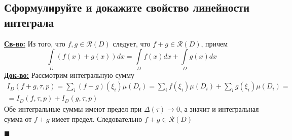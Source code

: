 
\subsection{Сформулируйте и докажите свойство линейности интеграла}

\textbf{\underline{Св-во:} } Из того, что $f, g \in \mathcal{R}(D)$ следует, что $f + g \in \mathcal{R}(D)$, причем 
\[\int\limits_D(f(x) + g(x))dx = \int\limits_Df(x)dx + \int\limits_Dg(x)dx \]
\textbf{\underline{Док-во:} } Рассмотрим интегральную сумму 
\begin{multline*}
    I_D(f + g, \tau, p) = \sum\limits_i(f + g)(\xi_i)\mu(D_i) = \sum\limits_if(\xi_i)\mu(D_i) + \sum\limits_ig(\xi_i)\mu(D_i) = \\ = I_D(f, \tau, p) + I_D(g, \tau, p)
\end{multline*}
Обе интегральные суммы имеют предел при $\Delta(\tau) \rightarrow 0$, а значит и интегральная сумма от $f + g$ имеет предел. Следовательно $f + g \in \mathcal{R}(D)$
\begin{flushright}
$\blacksquare$
\end{flushright}


